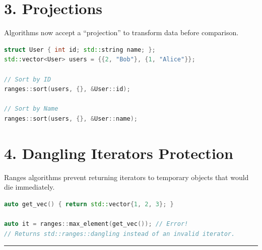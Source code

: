 \hypertarget{projections}{%
\section{3. Projections}\label{projections}}

Algorithms now accept a ``projection'' to transform data before
comparison.

\begin{lstlisting}[language={C++}]
struct User { int id; std::string name; };
std::vector<User> users = {{2, "Bob"}, {1, "Alice"}};

// Sort by ID
ranges::sort(users, {}, &User::id);

// Sort by Name
ranges::sort(users, {}, &User::name);
\end{lstlisting}

\hypertarget{dangling-iterators-protection}{%
\section{4. Dangling Iterators
Protection}\label{dangling-iterators-protection}}

Ranges algorithms prevent returning iterators to temporary objects that
would die immediately.

\begin{lstlisting}[language={C++}]
auto get_vec() { return std::vector{1, 2, 3}; }

auto it = ranges::max_element(get_vec()); // Error! 
// Returns std::ranges::dangling instead of an invalid iterator.
\end{lstlisting}

\begin{center}\rule{0.5\linewidth}{0.5pt}\end{center}
